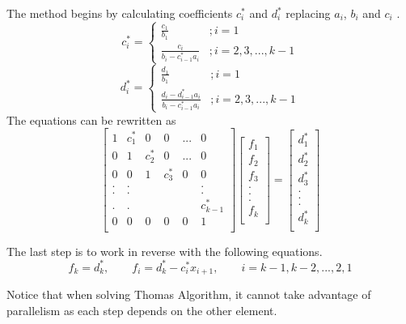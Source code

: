 \documentclass[12pt, oneside]{book}
\theoremstyle{plain}
\theoremstyle{definition}
\begin{document}
The method begins by calculating coefficients \(c^{*}_i\) and \(d^{*}_i\) replacing \(a_i\), \(b_i\) and \(c_i\) \cite{duffycpp}.
$$
c^{*}_i = \left\{
     \begin{array}{lr}
       \frac{c_1}{b_1} & ; i = 1\\
       \frac{c_i}{b_i - c^{*}_{i-1} a_i} & ; i = 2,3,...,k-1
     \end{array}
   \right.
$$
$$   
d^{*}_i = \left\{
     \begin{array}{lr}
       \frac{d_1}{b_1} & ; i = 1\\
       \frac{d_i-d^{*}_{i-1} a_i}{b_i - c^{*}_{i-1} a_i} & ; i = 2,3,...,k-1
     \end{array}
   \right.
   $$
The equations can be rewritten as 
$$
\begin{bmatrix}  
1 & c^{*}_1 & 0 & 0 & ... & 0 \\ 
0 & 1 & c^{*}_2 & 0 & ... & 0 \\ 
0 & 0 & 1 & c^{*}_3 & 0 & 0 \\ 
. & . &  &  &  & . \\ 
. & . &  &  &  & . \\ 
. & . &  &  &  & c^{*}_{k-1} \\ 
0 & 0 & 0 & 0 & 0 & 1 \\ 
\end{bmatrix} \begin{bmatrix}  
f_1 \\ 
f_2 \\ 
f_3 \\ 
.\\ 
.\\ 
.\\ 
f_k \\ 
\end{bmatrix} = \begin{bmatrix} 
d^{*}_1 \\ 
d^{*}_2 \\ 
d^{*}_3 \\ 
.\\ 
.\\ 
.\\ 
d^{*}_k \\ 
\end{bmatrix}
$$

The last step is to work in reverse with the following equations.
\[ f_k = d^{*}_k, \qquad f_i = d^{*}_k - c^{*}_i x_{i+1}, \qquad i = k-1, k-2, ... ,2,1 \]

Notice that when solving Thomas Algorithm, it cannot take advantage of parallelism as each step depends on the other element.
\end{document}
